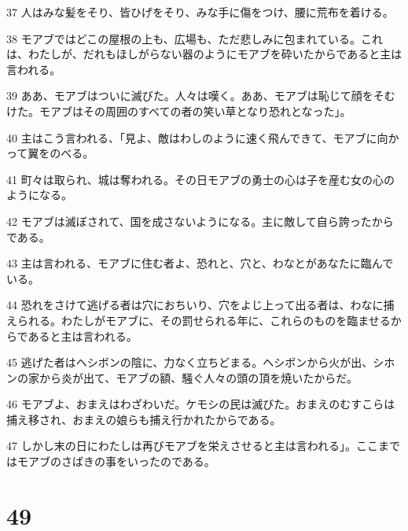 \par 37 人はみな髪をそり、皆ひげをそり、みな手に傷をつけ、腰に荒布を着ける。
\par 38 モアブではどこの屋根の上も、広場も、ただ悲しみに包まれている。これは、わたしが、だれもほしがらない器のようにモアブを砕いたからであると主は言われる。
\par 39 ああ、モアブはついに滅びた。人々は嘆く。ああ、モアブは恥じて顔をそむけた。モアブはその周囲のすべての者の笑い草となり恐れとなった」。
\par 40 主はこう言われる、「見よ、敵はわしのように速く飛んできて、モアブに向かって翼をのべる。
\par 41 町々は取られ、城は奪われる。その日モアブの勇士の心は子を産む女の心のようになる。
\par 42 モアブは滅ぼされて、国を成さないようになる。主に敵して自ら誇ったからである。
\par 43 主は言われる、モアブに住む者よ、恐れと、穴と、わなとがあなたに臨んでいる。
\par 44 恐れをさけて逃げる者は穴におちいり、穴をよじ上って出る者は、わなに捕えられる。わたしがモアブに、その罰せられる年に、これらのものを臨ませるからであると主は言われる。
\par 45 逃げた者はヘシボンの陰に、力なく立ちどまる。ヘシボンから火が出、シホンの家から炎が出て、モアブの額、騒ぐ人々の頭の頂を焼いたからだ。
\par 46 モアブよ、おまえはわざわいだ。ケモシの民は滅びた。おまえのむすこらは捕え移され、おまえの娘らも捕え行かれたからである。
\par 47 しかし末の日にわたしは再びモアブを栄えさせると主は言われる」。ここまではモアブのさばきの事をいったのである。

\chapter{49}

